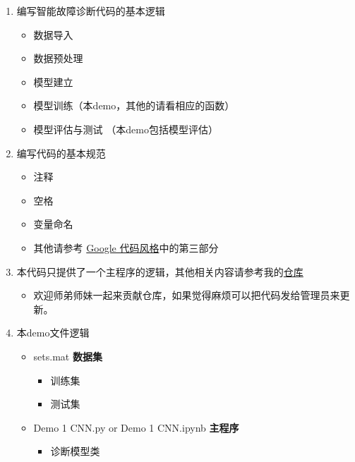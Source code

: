 \documentclass[11pt]{article}
\providecommand{\tightlist}{%
      \setlength{\itemsep}{0pt}\setlength{\parskip}{0pt}}
\begin{document}
\begin{enumerate}
\def\labelenumi{\arabic{enumi}.}
\tightlist
\item
  编写智能故障诊断代码的基本逻辑

  \begin{itemize}
  \tightlist
  \item
    数据导入
  \item
    数据预处理
  \item
    模型建立
  \item
    模型训练（本demo，其他的请看相应的函数）
  \item
    模型评估与测试 （本demo包括模型评估）
  \end{itemize}
\item
  编写代码的基本规范

  \begin{itemize}
  \tightlist
  \item
    注释
  \item
    空格
  \item
    变量命名
  \item
    其他请参考
    \href{https://github.com/shendeguize/GooglePythonStyleGuideCN}{Google
    代码风格}中的第三部分
  \end{itemize}
\item
  本代码只提供了一个主程序的逻辑，其他相关内容请参考我的\href{https://gitee.com/Leaky/diagnosis_for_beginners}{仓库}

  \begin{itemize}
  \tightlist
  \item
    欢迎师弟师妹一起来贡献仓库，如果觉得麻烦可以把代码发给管理员来更新。
  \end{itemize}
\item
  本demo文件逻辑

  \begin{itemize}
  \tightlist
  \item
    sets.mat \textbf{数据集}

    \begin{itemize}
    \tightlist
    \item
      训练集
    \item
      测试集
    \end{itemize}
  \item
    Demo 1 CNN.py or Demo 1 CNN.ipynb \textbf{主程序}

    \begin{itemize}
    \tightlist
    \item
      诊断模型类


\end{itemize}
\end{itemize}
\end{enumerate}
\end{document}
